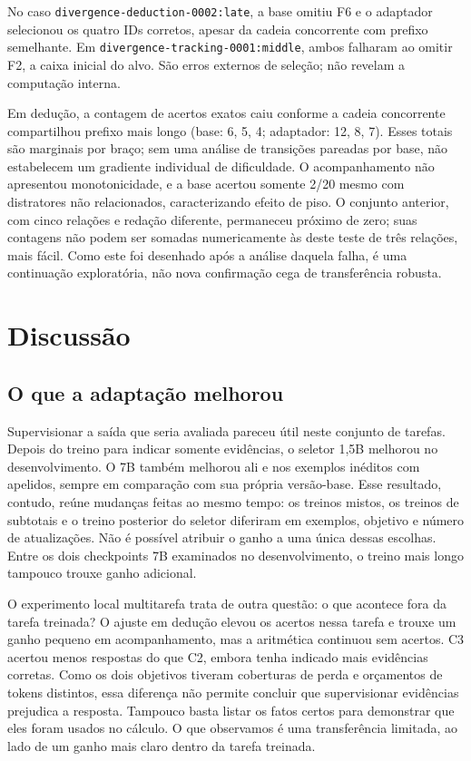\documentclass[12pt,a4paper]{article}
\begin{document}
No caso \nolinkurl{divergence-deduction-0002:late}, a base omitiu F6 e o adaptador selecionou os quatro IDs corretos, apesar da cadeia concorrente com prefixo semelhante. Em \nolinkurl{divergence-tracking-0001:middle}, ambos falharam ao omitir F2, a caixa inicial do alvo. São erros externos de seleção; não revelam a computação interna.

Em dedução, a contagem de acertos exatos caiu conforme a cadeia concorrente compartilhou prefixo mais longo (base: 6, 5, 4; adaptador: 12, 8, 7). Esses totais são marginais por braço; sem uma análise de transições pareadas por base, não estabelecem um gradiente individual de dificuldade. O acompanhamento não apresentou monotonicidade, e a base acertou somente 2/20 mesmo com distratores não relacionados, caracterizando efeito de piso. O conjunto anterior, com cinco relações e redação diferente, permaneceu próximo de zero; suas contagens não podem ser somadas numericamente às deste teste de três relações, mais fácil. Como este foi desenhado após a análise daquela falha, é uma continuação exploratória, não nova confirmação cega de transferência robusta.

\section{Discussão}
\subsection{O que a adaptação melhorou}
Supervisionar a saída que seria avaliada pareceu útil neste conjunto de tarefas. Depois do treino para indicar somente evidências, o seletor 1,5B melhorou no desenvolvimento. O 7B também melhorou ali e nos exemplos inéditos com apelidos, sempre em comparação com sua própria versão-base. Esse resultado, contudo, reúne mudanças feitas ao mesmo tempo: os treinos mistos, os treinos de subtotais e o treino posterior do seletor diferiram em exemplos, objetivo e número de atualizações. Não é possível atribuir o ganho a uma única dessas escolhas. Entre os dois checkpoints 7B examinados no desenvolvimento, o treino mais longo tampouco trouxe ganho adicional.

O experimento local multitarefa trata de outra questão: o que acontece fora da tarefa treinada? O ajuste em dedução elevou os acertos nessa tarefa e trouxe um ganho pequeno em acompanhamento, mas a aritmética continuou sem acertos. C3 acertou menos respostas do que C2, embora tenha indicado mais evidências corretas. Como os dois objetivos tiveram coberturas de perda e orçamentos de tokens distintos, essa diferença não permite concluir que supervisionar evidências prejudica a resposta. Tampouco basta listar os fatos certos para demonstrar que eles foram usados no cálculo. O que observamos é uma transferência limitada, ao lado de um ganho mais claro dentro da tarefa treinada.
\end{document}
